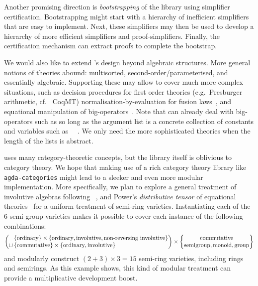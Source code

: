 Another promising direction is \emph{bootstrapping} of
the \Frexlib{} library using simplifier certification.
%
Bootstrapping might start with a hierarchy of inefficient simplifiers
that are easy to implement.
%
Next, these simplifiers may then be used to develop a hierarchy of
more efficient simplifiers and proof-simplifiers.
%
Finally, the certification mechanism can extract proofs to complete
the bootstrap.

We would also like to extend \Frexlib{}'s design beyond algebraic
structures. More general notions of theories abound: multisorted,
second-order/parameterised, and essentially algebraic.
%
Supporting these may allow \Frexlib{} to cover much more complex situations, such as decision
procedures for first order theories (e.g.~Presburger arithmetic,
cf.~ CoqMT) normalisation-by-evaluation
for fusion laws~\cite{allais:nu-rules}, and equational manipulation of
big-operators~\cite{betot-et-al:big-operators,markert:big-operators,lau:big-operators}.
%
Note that \Frexlib{} can already deal with big-operators such as  so
long as the argument list is a concrete collection of constants and
variables such as
\ \IdrisData{[2,}\ \IdrisData{]}. We
only need the more sophisticated theories when the length of the lists
is abstract.

\Frexlib{} uses many
category-theoretic concepts, but the library itself is oblivious to
category theory. %
We hope that making use of a rich category theory library like  {\tt agda-categories} might
lead to a sleeker and even more modular \Frexlib{} implementation. More
specifically, we plan to explore a general treatment of involutive
algebras following \citeauthor{jacobs:involution}~\citeyearpar{jacobs:involution}, and Power's
\emph{distributive tensor} of equational
theories~\cite{power:discrete-lawvere-theories,%
  hyland-power:discrete-lawvere-theories}
for a uniform treatment of semi-ring varieties.
Instantiating each of the $6$ semi-group varieties makes it possible to cover
each instance of the following combinations:
\[
\left(
\begin{array}{@{}l@{}}\hphantom{\cup{}}
  \set{\text{ordinary}}\times\set{\text{ordinary}, \text{involutive},
        \text{non-reversing involutive}}
\\\cup
\set{\text{commutative}}\times\set{\text{ordinary}, \text{involutive}
}
\end{array}
\right)\times\set{\begin{array}{@{}c@{}}
    \text{commutative}\\
    \text{semigroup}, \text{monoid}, \text{group}
  \end{array}
}
\]
and modularly construct $(2+3)\times 3 = 15$ semi-ring varieties,
including rings and semirings. As this example shows, this kind of
modular treatment can provide a multiplicative development boost.

